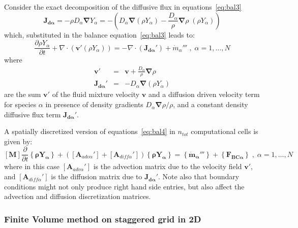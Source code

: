 \documentclass[12pt]{article}
\begin{document}
Consider the exact decomposition of the diffusive flux in equations~\eqref{eq:bal3}
%
\begin{equation}
   \mathbf{J_{d \alpha}} = - \rho D_\alpha \boldsymbol{\nabla} Y_\alpha =  - \left( D_\alpha \boldsymbol{\nabla} ( \rho Y_\alpha)
   - \frac{D_\alpha}{\rho} \boldsymbol{\nabla} \rho \; ( \rho Y_\alpha) \right) \label{eq:expdfl2}
\end{equation}
%
which, substituted in the balance equation~\eqref{eq:bal3} leads to:
%
\begin{equation}
 \frac{\partial \rho Y_\alpha}{ \partial t} + \nabla \cdot \left(  \mathbf{v}' (\rho Y_\alpha)   \right) = - \nabla \cdot \left(  \mathbf{J_{d \alpha}'} \right) + \dot{m}_\alpha''' \; , \; \alpha=1,\dots,N \label{eq:bal4}
\end{equation}
%
where
%
\begin{eqnarray}
  \mathbf{v}' &=& \mathbf{v} + \frac{D_\alpha}{\rho} \boldsymbol{\nabla} \rho  \label{eq:vprime} \\
   \mathbf{J_{d \alpha}'} &=& -D_\alpha \boldsymbol{\nabla}  (\rho Y_\alpha )  \label{eq:jdaprime}
\end{eqnarray}
%
are the sum $\mathbf{v}'$ of the fluid mixture velocity $\mathbf{v}$ and a diffusion driven velocity term for species $\alpha$ in presence of density gradients $D_\alpha \boldsymbol{\nabla} \rho / \rho $, and a constant density diffusive flux term $\mathbf{J_{d \alpha}'}$.

A spatially discretized version of equations~\eqref{eq:bal4} in $n_{tot}$ computational cells is given by:
%
\begin{equation}
\left[ \mathbf{M} \right] \frac{\partial}{\partial t} \left\{ \mathbf{\rho Y_\alpha} \right\} + \left( \left[ \mathbf{A}_{adv \alpha}'  \right] +\left[ \mathbf{A}_{diff \alpha}' \right] \right) \left\{ \mathbf{\rho Y_\alpha} \right\}   =  \left\{  \mathbf{\dot{m}_\alpha'''} \right\} +  \left\{ \mathbf{F_{BC \alpha}} \right\} \; , \; \alpha=1,\dots,N \label{eq:discbal4}
\end{equation}
%
where in this case $ \left[ \mathbf{A}_{adv \alpha}'  \right]$ is the advection matrix due to the velocity field $\mathbf{v}'$, and  $\left[ \mathbf{A}_{diff \alpha}' \right]$ is the diffusion matrix due to $ \mathbf{J_{d \alpha}'} $. Note also that boundary conditions might not only produce right hand side entries, but also affect the advection and diffusion discretization matrices.



\subsubsection{Finite Volume method on staggered grid in 2D}
\end{document}
